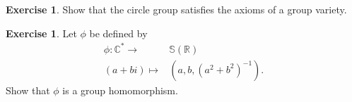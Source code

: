 \documentclass[a4paper,12pt,reqno]{amsart}
\makeatletter
\renewcommand{\listoftodos}[1][\@todonotes@todolistname]{%
	\@starttoc{tdo}{#1}}
\newcommand{\field}[1]{\mathbb{#1}}  %
\newcommand{\R}{\field{R}} %
\newcommand{\C}{\field{C}} %
\renewcommand{\SS}{\field{S}}
\theoremstyle{definition}
\newtheorem{exercise}[lemma]{Exercise}
\numberwithin{lemma}{section}
\numberwithin{equation}{section}
\numberwithin{figure}{section}
\makeatother
\begin{document}
\begin{exercise}
	Show that the circle group satisfies the axioms of a group variety.
\end{exercise}
\begin{exercise}
Let $\phi$ be defined by 
\begin{align*}
  \phi:\C^* \to& \SS(\R) \\
         (a+bi) \mapsto& (a,b,(a^2+b^2)^{-1}).
\end{align*}
Show that $\phi$ is a group homomorphism.
\end{exercise}




\listoftodos


{}
\end{document}
